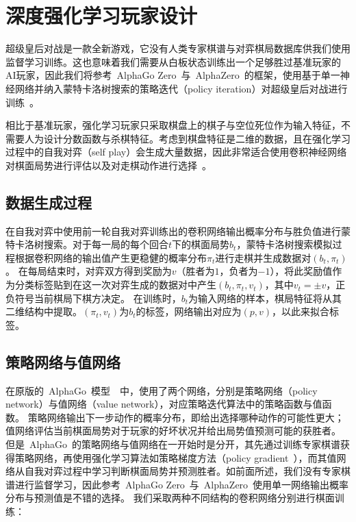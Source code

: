 \section{深度强化学习玩家设计}
超级皇后对战是一款全新游戏，它没有人类专家棋谱与对弈棋局数据库供我们使用监督学习训练。这也意味着我们需要从白板状态训练出一个足够胜过基准玩家的AI玩家，因此我们将参考~AlphaGo Zero~与~AlphaZero~的框架，使用基于单一神经网络并纳入蒙特卡洛树搜索的策略迭代（policy iteration）对超级皇后对战进行训练~\cite{Silver1140,Silver2017,Silver2016}。

相比于基准玩家，强化学习玩家只采取棋盘上的棋子与空位死位作为输入特征，不需要人为设计分数函数与杀棋特征。考虑到棋盘特征是二维的数据，且在强化学习过程中的自我对弈（self play）会生成大量数据，因此非常适合使用卷积神经网络对棋面局势进行评估以及对走棋动作进行选择~\cite{Silver2016}。

\subsection{数据生成过程}
在自我对弈中使用前一轮自我对弈训练出的卷积网络输出概率分布与胜负值进行蒙特卡洛树搜索。对于每一局的每个回合$t$下的棋面局势$b_{t}$，蒙特卡洛树搜索模拟过程根据卷积网络的输出值产生更稳健的概率分布$\pi_{t}$进行走棋并生成数据对$(b_{t},\pi_{t})$。
在每局结束时，对弈双方得到奖励为$v$（胜者为$1$，负者为$-1$），将此奖励值作为分类标签贴到在这一次对弈生成的数据对中产生$(b_{t},\pi_{t},v_{t})$，其中$v_{t}=\pm v$，正负符号当前棋局下棋方决定。
在训练时，$b_{t}$为输入网络的样本，棋局特征将从其二维结构中提取。$(\pi_{t},v_{t})$为$b_{t}$的标签，网络输出对应为$(p,v)$，以此来拟合标签。
\subsection{策略网络与值网络}
在原版的~AlphaGo~模型~\cite{Silver2016}~中，使用了两个网络，分别是策略网络（policy network）与值网络（value network），对应策略迭代算法中的策略函数与值函数。
策略网络输出下一步动作的概率分布，即给出选择哪种动作的可能性更大；值网络评估当前棋面局势对于玩家的好坏状况并给出局势值预测可能的获胜者。
但是~AlphaGo~的策略网络与值网络在一开始时是分开，其先通过训练专家棋谱获得策略网络，再使用强化学习算法如策略梯度方法（policy gradient~\cite{silver2014deterministic}），而其值网络从自我对弈过程中学习判断棋面局势并预测胜者。如前面所述，我们没有专家棋谱进行监督学习，因此参考~AlphaGo Zero~与~AlphaZero~使用单一网络输出概率分布与预测值是不错的选择。
我们采取两种不同结构的卷积网络分别进行棋面训练：
